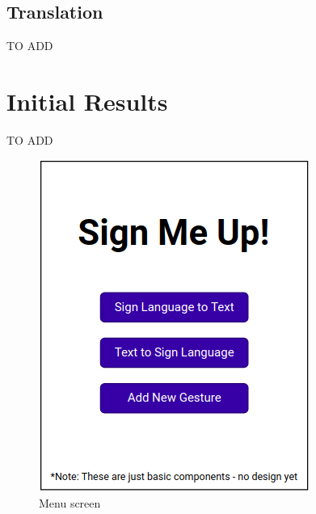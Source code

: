 \documentclass[journal]{./IEEE/IEEEtran}
\begin{document}
\subsection{Translation}
TO ADD

\section{Initial Results}
TO ADD






\appendix
\begin{figure}[ht!]
    \centering
    \includegraphics[width=.95\linewidth]{./images/1.png}
    \caption{Menu screen}
    \label{fig:label1}
\end{figure}
\end{document}
